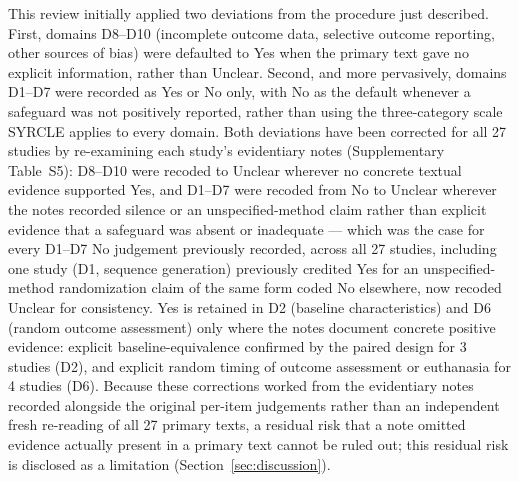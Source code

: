 \documentclass[5p,times,twocolumn]{elsarticle}
\begin{document}
This review initially applied two deviations from the procedure just described. First, domains D8--D10 (incomplete outcome data, selective outcome reporting, other sources of bias) were defaulted to Yes when the primary text gave no explicit information, rather than Unclear. Second, and more pervasively, domains D1--D7 were recorded as Yes or No only, with No as the default whenever a safeguard was not positively reported, rather than using the three-category scale SYRCLE applies to every domain. Both deviations have been corrected for all 27 studies by re-examining each study's evidentiary notes (Supplementary Table~S5): D8--D10 were recoded to Unclear wherever no concrete textual evidence supported Yes, and D1--D7 were recoded from No to Unclear wherever the notes recorded silence or an unspecified-method claim rather than explicit evidence that a safeguard was absent or inadequate --- which was the case for every D1--D7 No judgement previously recorded, across all 27 studies, including one study (D1, sequence generation) previously credited Yes for an unspecified-method randomization claim of the same form coded No elsewhere, now recoded Unclear for consistency. Yes is retained in D2 (baseline characteristics) and D6 (random outcome assessment) only where the notes document concrete positive evidence: explicit baseline-equivalence confirmed by the paired design for 3 studies (D2), and explicit random timing of outcome assessment or euthanasia for 4 studies (D6). Because these corrections worked from the evidentiary notes recorded alongside the original per-item judgements rather than an independent fresh re-reading of all 27 primary texts, a residual risk that a note omitted evidence actually present in a primary text cannot be ruled out; this residual risk is disclosed as a limitation (Section~\ref{sec:discussion}).
\end{document}
